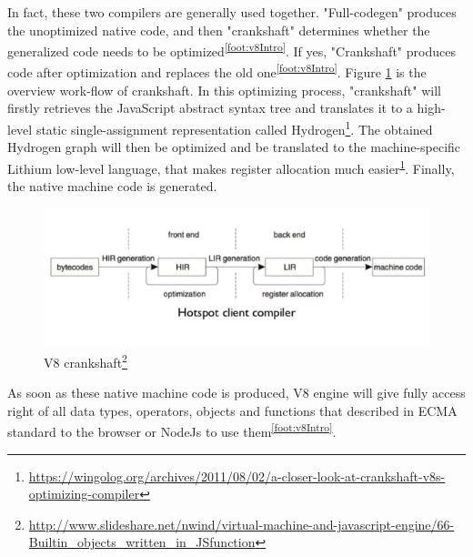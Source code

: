     In fact, these two compilers are generally used together. "Full-codegen" produces the unoptimized native code, and then "crankshaft" determines whether the generalized code needs to be optimized\textsuperscript{\ref{foot:v8Intro}}. If yes, "Crankshaft" produces code after optimization and replaces the old one\textsuperscript{\ref{foot:v8Intro}}. Figure \ref{fig:crankshaft} is the overview work-flow of crankshaft. In this optimizing process, "crankshaft" will firstly retrieves the JavaScript abstract syntax tree and translates it to a high-level static single-assignment representation called Hydrogen\footnote{\label{foot:wingolog}\url{https://wingolog.org/archives/2011/08/02/a-closer-look-at-crankshaft-v8s-optimizing-compiler}}. The obtained Hydrogen graph will then be optimized and be translated to the machine-specific Lithium low-level language, that makes register allocation much easier\textsuperscript{\ref{foot:wingolog}}. Finally, the native machine code is generated.
        
         \begin{figure}[H]
            \centering
            \includegraphics[scale = 0.4]
            {Images/concepts/crankshaft.png}
            \caption[crankshaft]%
            {V8 crankshaft\footnote{\url{http://www.slideshare.net/nwind/virtual-machine-and-javascript-engine/66-Builtin_objects_written_in_JSfunction}}}  
            \label{fig:crankshaft}
        \end{figure}
        
     As soon as these native machine code is produced, V8 engine will give fully access right of all data types, operators, objects and functions that described in ECMA standard to the browser or NodeJs to use them\textsuperscript{\ref{foot:v8Intro}}.   
     
